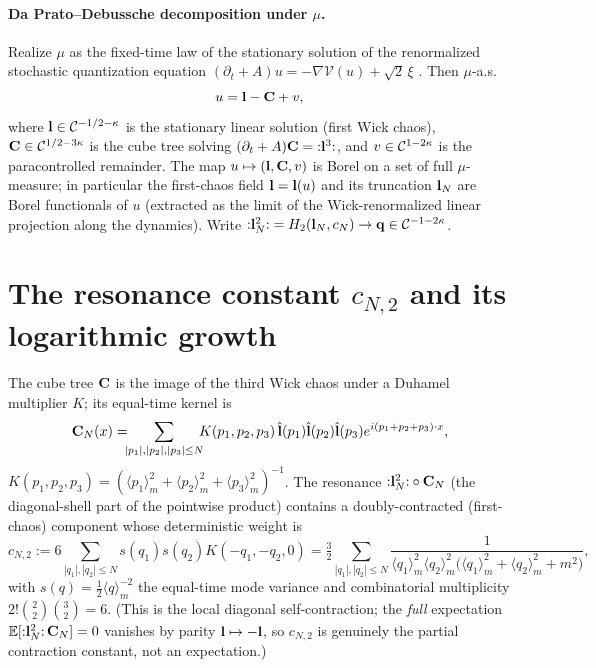 \paragraph{Da Prato--Debussche decomposition under $\mu$.}
Realize $\mu$ as the fixed-time law of the stationary solution of the renormalized
stochastic quantization equation $(\partial_t+A)u=-\nabla\mathcal V(u)+\sqrt2\,\xi$
\cite{CC18,MW17,GH21}. Then $\mu$-a.s.
\begin{equation}\label{eq:DPD}
u=\mathbf{l}-\mathbf{C}+v,
\end{equation}
where $\mathbf{l}\in\mathcal{C}^{-1/2-\kappa}$ is the stationary linear solution (first Wick
chaos), $\mathbf{C}\in\mathcal{C}^{1/2-3\kappa}$ is the cube tree solving
$(\partial_t+A)\mathbf{C}={:}\mathbf{l}^3{:}$, and $v\in\mathcal{C}^{1-2\kappa}$ is the
paracontrolled remainder. The map $u\mapsto(\mathbf{l},\mathbf{C},v)$ is Borel on a set of
full $\mu$-measure; in particular the first-chaos field $\mathbf{l}=\mathbf{l}(u)$ and its
truncation $\mathbf{l}_N$ are Borel functionals of $u$ (extracted as the limit of the
Wick-renormalized linear projection along the dynamics). Write
${:}\mathbf{l}_N^2{:}=H_2(\mathbf{l}_N,c_N)\to\mathbf{q}\in\mathcal{C}^{-1-2\kappa}$.

\section*{The resonance constant $c_{N,2}$ and its logarithmic growth}

The cube tree $\mathbf{C}$ is the image of the third Wick chaos under a Duhamel
multiplier $K$; its equal-time kernel is
\begin{equation}\label{eq:Ckernel}
\mathbf{C}_N(x)=\!\!\!\sum_{|p_1|,|p_2|,|p_3|\le N}\!\!\!K(p_1,p_2,p_3)\,\hat{\mathbf{l}}(p_1)\hat{\mathbf{l}}(p_2)\hat{\mathbf{l}}(p_3)e^{i(p_1+p_2+p_3)\cdot x},
\end{equation}
$K(p_1,p_2,p_3)=(\langle p_1\rangle_m^2+\langle p_2\rangle_m^2+\langle p_3\rangle_m^2)^{-1}$.
The resonance ${:}\mathbf{l}_N^2{:}\circ\mathbf{C}_N$ (the diagonal-shell part of the
pointwise product) contains a doubly-contracted (first-chaos) component whose
deterministic weight is
\begin{equation}\label{eq:cN2}
c_{N,2}:=6\!\!\sum_{|q_1|,|q_2|\le N}\!\!s(q_1)s(q_2)K(-q_1,-q_2,0)
=\tfrac32\!\!\sum_{|q_1|,|q_2|\le N}\!\!\frac{1}{\langle q_1\rangle_m^2\langle q_2\rangle_m^2\bigl(\langle q_1\rangle_m^2+\langle q_2\rangle_m^2+m^2\bigr)},
\end{equation}
with $s(q)=\tfrac12\langle q\rangle_m^{-2}$ the equal-time mode variance and
combinatorial multiplicity $2!\binom22\binom32=6$. (This is the local diagonal
self-contraction; the \emph{full} expectation $\mathbb{E}[{:}\mathbf{l}_N^2{:}\,\mathbf{C}_N]=0$
vanishes by parity $\mathbf{l}\mapsto-\mathbf{l}$, so $c_{N,2}$ is genuinely the partial
contraction constant, not an expectation.)

